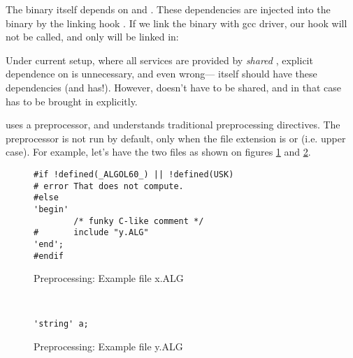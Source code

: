 \documentclass[a4paper,11pt]{article}
\begin{document}
The binary itself depends on  and .  These
dependencies are injected into the binary by the linking hook
.  If we link the binary with gcc
driver, our hook will not be called, and only  will be
linked in:


Under current setup, where all  services are provided by {\em
shared} , explicit dependence on  is
unnecessary, and even wrong--- itself should have these
dependencies (and has!).  However,  doesn't have to be
shared, and in that case  has to be brought in explicitly.

 uses a preprocessor, and understands traditional
preprocessing directives.  The preprocessor is not run by default,
only when the file extension is  or  (i.e. upper
case).  For example, let's have the two files as shown on figures
\ref{Figure++PreprocessX} and \ref{Figure++PreprocessY}.

\begin{figure}
\begin{verbatim}
#if !defined(_ALGOL60_) || !defined(USK)
# error That does not compute.
#else
'begin'
        /* funky C-like comment */
#       include "y.ALG"
'end';
#endif
\end{verbatim}
\caption{Preprocessing: Example file x.ALG}
\label{Figure++PreprocessX}
\end{figure}

\begin{figure}
\begin{verbatim}


'string' a;
\end{verbatim}
\caption{Preprocessing: Example file y.ALG}
\label{Figure++PreprocessY}
\end{figure}

\end{document}
